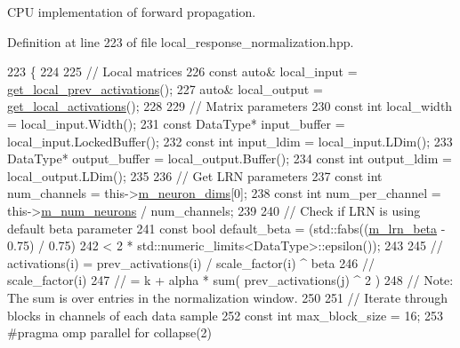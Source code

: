 C\+PU implementation of forward propagation. 



Definition at line 223 of file local\+\_\+response\+\_\+normalization.\+hpp.


\begin{DoxyCode}
223                         \{
224 
225     \textcolor{comment}{// Local matrices}
226     \textcolor{keyword}{const} \textcolor{keyword}{auto}& local\_input = \hyperlink{classlbann_1_1Layer_a35397843bb0c84030000c7d872229acb}{get\_local\_prev\_activations}();
227     \textcolor{keyword}{auto}& local\_output = \hyperlink{classlbann_1_1Layer_a4248f27acebf72b7b7b3ee39c8bcb62a}{get\_local\_activations}();
228 
229     \textcolor{comment}{// Matrix parameters}
230     \textcolor{keyword}{const} \textcolor{keywordtype}{int} local\_width = local\_input.Width();
231     \textcolor{keyword}{const} DataType* input\_buffer = local\_input.LockedBuffer();
232     \textcolor{keyword}{const} \textcolor{keywordtype}{int} input\_ldim = local\_input.LDim();
233     DataType* output\_buffer = local\_output.Buffer();
234     \textcolor{keyword}{const} \textcolor{keywordtype}{int} output\_ldim = local\_output.LDim();
235 
236     \textcolor{comment}{// Get LRN parameters}
237     \textcolor{keyword}{const} \textcolor{keywordtype}{int} num\_channels = this->\hyperlink{classlbann_1_1Layer_abb34bb8031f57a483e2e327a5f229f48}{m\_neuron\_dims}[0];
238     \textcolor{keyword}{const} \textcolor{keywordtype}{int} num\_per\_channel = this->\hyperlink{classlbann_1_1Layer_a6b5ebc8a7d9329d8a773ed787e7b41d8}{m\_num\_neurons} / num\_channels;
239 
240     \textcolor{comment}{// Check if LRN is using default beta parameter}
241     \textcolor{keyword}{const} \textcolor{keywordtype}{bool} default\_beta = (std::fabs((\hyperlink{classlbann_1_1local__response__normalization__layer_ad06848e9d59664be86aecbc1e2ba556f}{m\_lrn\_beta} - 0.75) / 0.75)
242                                < 2 * std::numeric\_limits<DataType>::epsilon());
243 
245     \textcolor{comment}{// activations(i) = prev\_activations(i) / scale\_factor(i) ^ beta}
246     \textcolor{comment}{// scale\_factor(i)}
247     \textcolor{comment}{//   = k + alpha * sum( prev\_activations(j) ^ 2 )}
248     \textcolor{comment}{// Note: The sum is over entries in the normalization window.}
250 \textcolor{comment}{}
251     \textcolor{comment}{// Iterate through blocks in channels of each data sample}
252     \textcolor{keyword}{const} \textcolor{keywordtype}{int} max\_block\_size = 16;
253 \textcolor{preprocessor}{    #pragma omp parallel for collapse(2)}

\end{DoxyCode}
